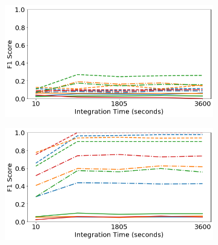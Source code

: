 \begin{figure}[H]
     \centering
     \begin{subfigure}[b]{0.49\textwidth}
         \centering
         \includegraphics[width=\textwidth]{images/generalization-cal-easy-01.png}
         \caption{}
         \label{fig:generalization-cal-easy-01}
     \end{subfigure}
     \hfill
     \begin{subfigure}[b]{0.49\textwidth}
         \centering
         \includegraphics[width=\textwidth]{images/generalization-cal-easy-05.png}
         \caption{}
         \label{fig:generalization-cal-easy-05}
     \end{subfigure}


\end{figure}

